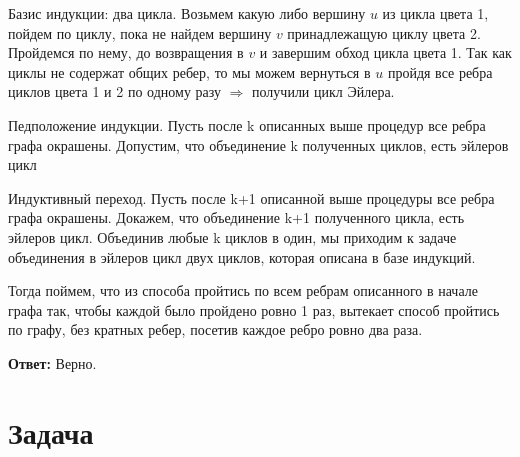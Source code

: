 \documentclass{article}
\begin{document}
Базис индукции: два цикла.
Возьмем какую либо вершину $u$ из цикла цвета 1, пойдем по циклу, пока не найдем вершину $v$ принадлежащую циклу цвета 2. Пройдемся по нему, до возвращения в $v$ и завершим обход цикла цвета 1. Так как циклы не содержат общих ребер, то мы можем вернуться в $u$ пройдя все ребра циклов цвета 1 и 2 по одному разу $\Rightarrow$ получили цикл Эйлера. 

Педположение индукции.
Пусть после k описанных выше процедур все ребра графа окрашены.
Допустим, что  объединение k полученных  циклов, есть эйлеров цикл

Индуктивный переход.
Пусть после k+1 описанной выше процедуры все ребра графа окрашены. Докажем, что объединение k+1 полученного цикла, есть эйлеров цикл. Объединив любые k циклов в один, мы приходим к задаче объединения в эйлеров цикл двух циклов, которая описана в базе индукций.

Тогда поймем, что из способа пройтись по всем ребрам описанного в начале графа так, чтобы каждой было пройдено 
ровно 1 раз, вытекает способ пройтись по графу, без кратных ребер, посетив каждое ребро ровно два раза.

\textbf{Ответ:} Верно.

\section{Задача }
\end{document}
